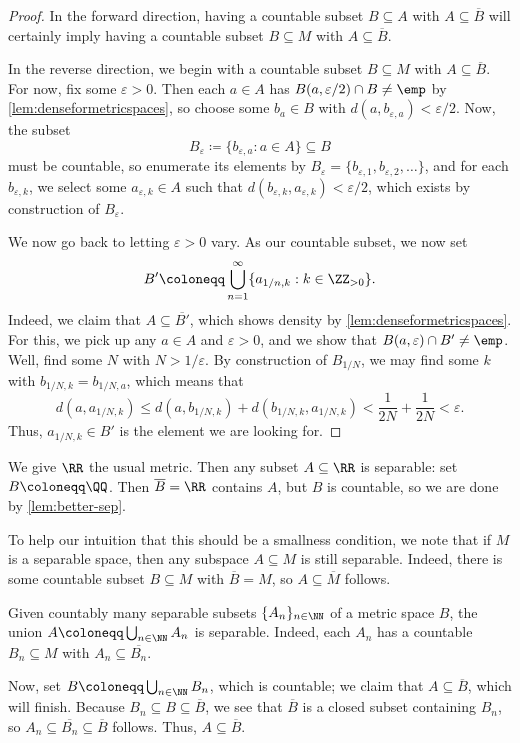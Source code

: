 \documentclass[../notes.tex]{subfiles}
\begin{document}
\begin{proof}
	In the forward direction, having a countable subset $B\subseteq A$ with $A\subseteq\overline B$ will certainly imply having a countable subset $B\subseteq M$ with $A\subseteq\overline B$.

	In the reverse direction, we begin with a countable subset $B\subseteq M$ with $A\subseteq\overline B$. For now, fix some $\varepsilon>0$. Then each $a\in A$ has $B(a,\varepsilon/2)\cap B\ne\emp$ by \autoref{lem:denseformetricspaces}, so choose some $b_a\in B$ with $d(a,b_{\varepsilon,a})<\varepsilon/2$. Now, the subset
	\[B_\varepsilon\coloneqq\{b_{\varepsilon,a}:a\in A\}\subseteq B\]
	must be countable, so enumerate its elements by $B_\varepsilon=\{b_{\varepsilon,1},b_{\varepsilon,2},\ldots\}$, and for each $b_{\varepsilon,k}$, we select some $a_{\varepsilon,k}\in A$ such that $d(b_{\varepsilon,k},a_{\varepsilon,k})<\varepsilon/2$, which exists by construction of $B_\varepsilon$.

	We now go back to letting $\varepsilon>0$ vary. As our countable subset, we now set
	\[B'\coloneqq\bigcup_{n=1}^\infty\{a_{1/n,k}:k\in\ZZ_{>0}\}.\]
	Indeed, we claim that $A\subseteq\overline {B'}$, which shows density by \autoref{lem:denseformetricspaces}. For this, we pick up any $a\in A$ and $\varepsilon>0$, and we show that $B(a,\varepsilon)\cap B'\ne\emp$. Well, find some $N$ with $N>1/\varepsilon$. By construction of $B_{1/N}$, we may find some $k$ with $b_{1/N,k}=b_{1/N,a}$, which means that
	\[d(a,a_{1/N,k})\le d(a,b_{1/N,k})+d(b_{1/N,k},a_{1/N,k})<\frac1{2N}+\frac1{2N}<\varepsilon.\]
	Thus, $a_{1/N,k}\in B'$ is the element we are looking for.
\end{proof}
\begin{example} \label{ex:all-sep-in-r}
	We give $\RR$ the usual metric. Then any subset $A\subseteq\RR$ is separable: set $B\coloneqq\QQ$. Then $\overline B=\RR$ contains $A$, but $B$ is countable, so we are done by \autoref{lem:better-sep}.
\end{example}
\begin{remark} \label{rem:subspace-of-sep-is-sep}
	To help our intuition that this should be a smallness condition, we note that if $M$ is a separable space, then any subspace $A\subseteq M$ is still separable. Indeed, there is some countable subset $B\subseteq M$ with $\overline B=M$, so $A\subseteq\overline M$ follows.
\end{remark}
\begin{example} \label{ex:union-of-seps-is-sep}
	Given countably many separable subsets $\{A_n\}_{n\in\NN}$ of a metric space $B$, the union $A\coloneqq\bigcup_{n\in\NN}A_n$ is separable. Indeed, each $A_n$ has a countable $B_n\subseteq M$ with $A_n\subseteq\overline{B_n}$.

	Now, set $B\coloneqq\bigcup_{n\in\NN}B_n$, which is countable; we claim that $A\subseteq\overline B$, which will finish. Because $B_n\subseteq B\subseteq\overline B$, we see that $\overline B$ is a closed subset containing $B_n$, so $A_n\subseteq\overline{B_n}\subseteq\overline B$ follows. Thus, $A\subseteq\overline B$.
\end{example}
\end{document}
